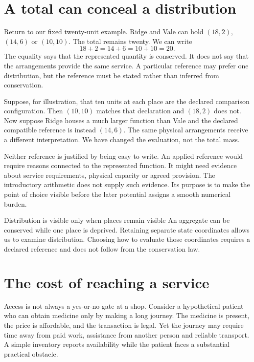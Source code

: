 \section{A total can conceal a distribution}
Return to our fixed twenty-unit example. Ridge and Vale can hold $(18,2)$, $(14,6)$ or $(10,10)$. The total remains twenty. We can write
\begin{equation}
18+2=14+6=10+10=20.
\end{equation}
The equality says that the represented quantity is conserved. It does not say that the arrangements provide the same service. A particular reference may prefer one distribution, but the reference must be stated rather than inferred from conservation.

Suppose, for illustration, that ten units at each place are the declared comparison configuration. Then $(10,10)$ matches that declaration and $(18,2)$ does not. Now suppose Ridge houses a much larger function than Vale and the declared compatible reference is instead $(14,6)$. The same physical arrangements receive a different interpretation. We have changed the evaluation, not the total mass.

Neither reference is justified by being easy to write. An applied reference would require reasons connected to the represented function. It might need evidence about service requirements, physical capacity or agreed provision. The introductory arithmetic does not supply such evidence. Its purpose is to make the point of choice visible before the later potential assigns a smooth numerical burden.

\begin{intuitionbox}{Distribution is visible only when places remain visible}
An aggregate can be conserved while one place is deprived. Retaining separate state coordinates allows us to examine distribution. Choosing how to evaluate those coordinates requires a declared reference and does not follow from the conservation law.
\end{intuitionbox}

\section{The cost of reaching a service}
Access is not always a yes-or-no gate at a shop. Consider a hypothetical patient who can obtain medicine only by making a long journey. The medicine is present, the price is affordable, and the transaction is legal. Yet the journey may require time away from paid work, assistance from another person and reliable transport. A simple inventory reports availability while the patient faces a substantial practical obstacle.

